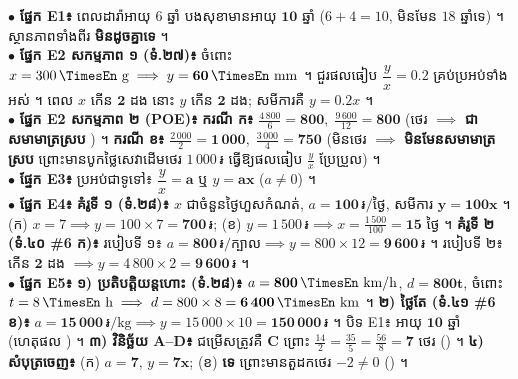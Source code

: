 \documentclass[a4paper,10pt]{article}
\newcommand{\en}[1]{{\TimesEn #1}}
\newcommand{\unit}[1]{\,\text{\en{#1}}}
\newcommand{\riel}{\,\text{៛}}
\newcommand{\cnum}[1]{\mbox{\fontsize{10pt}{12pt}\selectfont\ding{\numexpr181+#1\relax}}}
\begin{document}
\begin{tcolorbox}[
  enhanced, sharp corners, colback=white, colframe=black,
  boxrule=0.8pt, boxsep=1.5pt, top=3pt, bottom=3pt, left=5pt, right=5pt,
  after skip=3.5pt
]
  \fontsize{8.8pt}{13.0pt}\selectfont
  $\bullet$ \textbf{ផ្នែក \en{E1}៖} ពេលដារ៉ាអាយុ $6$ ឆ្នាំ បងសុខាមានអាយុ $\mathbf{10}$ ឆ្នាំ ($6+4=10$, មិនមែន $18$ ឆ្នាំទេ) ។ ស្ថានភាពទាំងពីរ \textbf{មិនដូចគ្នាទេ} ។\\[2pt]
  $\bullet$ \textbf{ផ្នែក \en{E2} សកម្មភាព ១ (ទំ.២៧)៖} ចំពោះ $x = 300\unit{g} \implies y = \mathbf{60\unit{mm}}$ ។ ជួរផលធៀប $\dfrac{y}{x} = \mathbf{0.2}$ គ្រប់ប្រអប់ទាំងអស់ ។ ពេល $x$ កើន $\mathbf{2}$ ដង នោះ $y$ កើន $\mathbf{2}$ ដង; សមីការគឺ $y = \mathbf{0.2}x$ ។\\[2pt]
  $\bullet$ \textbf{ផ្នែក \en{E2} សកម្មភាព ២ (\en{POE})៖}
  \textbf{ករណី ក៖} $\frac{4\,800}{6} = \mathbf{800},\; \frac{9\,600}{12} = \mathbf{800}$ (ថេរ $\implies$ \textbf{ជាសមាមាត្រស្រប} ) ។
  \textbf{ករណី ខ៖} $\frac{2\,000}{2} = \mathbf{1\,000},\; \frac{3\,000}{4} = \mathbf{750}$ (មិនថេរ $\implies$ \textbf{មិនមែនសមាមាត្រស្រប}  ព្រោះមានបូកថ្លៃសេវាដើមថេរ $1\,000\riel$ ធ្វើឱ្យផលធៀប $\frac{y}{x}$ ប្រែប្រួល) ។\\[2pt]
  $\bullet$ \textbf{ផ្នែក \en{E3}៖} ប្រអប់ជាទូទៅ៖ $\dfrac{y}{x} = \mathbf{a}$ ឬ $y = \mathbf{ax}$ ($a\neq 0$) ។\\[2pt]
  $\bullet$ \textbf{ផ្នែក \en{E4}៖}
  \textbf{គំរូទី ១ (ទំ.២៨)៖} $x$ ជាចំនួនថ្ងៃហួសកំណត់, $a = \mathbf{100}\riel/\text{ថ្ងៃ}$, សមីការ $\mathbf{y = 100x}$ ។ (ក) $x=7 \implies y = 100\times 7 = \mathbf{700\riel}$; (ខ) $y=1\,500\riel \implies x = \frac{1\,500}{100} = \mathbf{15}$ ថ្ងៃ ។
  \textbf{គំរូទី ២ (ទំ.៤០ \#6 ក)៖} របៀបទី ១៖ $a = \mathbf{800}\riel/\text{ក្បាល} \implies y = 800\times 12 = \mathbf{9\,600\riel}$ ។ របៀបទី ២៖ កើន $\mathbf{2}$ ដង $\implies y = 4\,800\times 2 = \mathbf{9\,600\riel}$ ។\\[2pt]
  $\bullet$ \textbf{ផ្នែក \en{E5}៖}
  \textbf{១) ប្រតិបត្តិយន្តហោះ (ទំ.២៨)៖} $a = \mathbf{800}\unit{km/h}$, $d = \mathbf{800t}$, ចំពោះ $t=8\unit{h} \implies d = 800\times 8 = \mathbf{6\,400\unit{km}}$ ។
  \textbf{២) ថ្លៃតែ (ទំ.៤១ \#6 ខ)៖} $a = \mathbf{15\,000}\riel/\text{kg} \implies y = 15\,000\times 10 = \mathbf{150\,000\riel}$ ។ បិទ \en{E1}៖ អាយុ $\mathbf{10}$ ឆ្នាំ (ហេតុផល \cnum{4}) ។
  \textbf{៣) វិនិច្ឆ័យ \en{A--D}៖} ជម្រើសត្រូវគឺ \textbf{\en{C}} ព្រោះ $\frac{14}{2}=\frac{35}{5}=\frac{56}{8}=\mathbf{7}$ ថេរ (\cnum{1}) ។
  \textbf{៤) សំបុត្រចេញ៖} (ក) $a = \mathbf{7}$, $y = \mathbf{7x}$; (ខ) \textbf{ទេ} ព្រោះមានតួដកថេរ $-2 \neq 0$ (\cnum{4}) ។
\end{tcolorbox}
\end{document}
